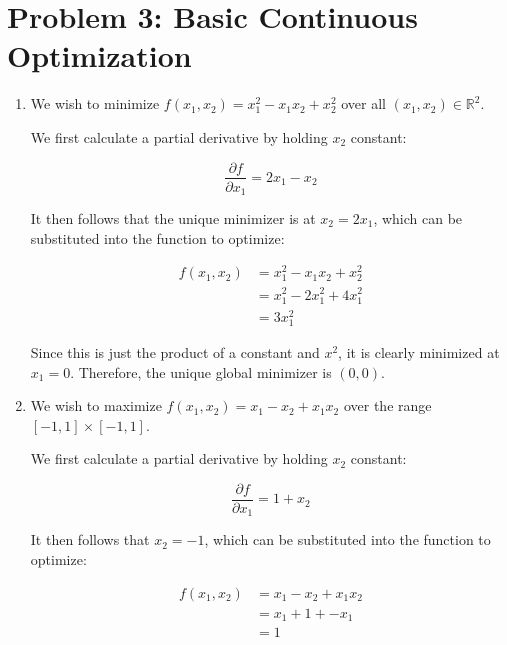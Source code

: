 \documentclass[12pt]{article}%
\begin{document}
\section*{Problem 3: Basic Continuous Optimization}
\begin{enumerate}[label=(\alph*)]
\item We wish to minimize $f(x_1,x_2) = x_{1}^{2} - x_{1}x_{2} + x_{2}^{2}$ over all $(x_1,x_2) \in \mathbb{R}^2$.

We first calculate a partial derivative by holding $x_2$ constant:

\begin{equation}
\frac{\partial f}{\partial x_1} = 2x_1 - x_2
\end{equation}

It then follows that the unique minimizer is at $x_2 = 2x_1$, which can be substituted into the function to optimize:

\begin{equation}
\begin{split}
f(x_1,x_2) &= x_{1}^{2} - x_{1}x_{2} + x_{2}^{2} \\
&= x_{1}^{2} - 2x_{1}^{2} + 4x_{1}^{2} \\
&= 3x_{1}^{2}
\end{split}
\end{equation}

Since this is just the product of a constant and $x^2$, it is clearly minimized at $x_1 = 0$. Therefore, the unique global minimizer is $(0,0)$.

\item We wish to maximize $f(x_1,x_2) = x_1 - x_2 + x_{1}x_{2}$ over the range $[-1,1] \times [-1, 1]$.

We first calculate a partial derivative by holding $x_2$ constant:

\begin{equation}
\frac{\partial f}{\partial x_1} = 1 + x_2
\end{equation}

It then follows that $x_2 = -1$, which can be substituted into the function to optimize:

\begin{equation}
\begin{split}
f(x_1,x_2) &= x_1 - x_2 + x_{1}x_{2} \\
&= x_1 + 1 + -x_1 \\
&= 1
\end{split}
\end{equation}


\end{enumerate}
\end{document}
